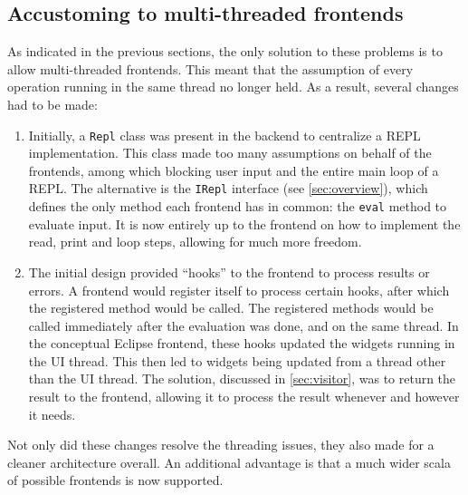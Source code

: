 \subsection{Accustoming to multi-threaded frontends}

As indicated in the previous sections, the only solution to these problems is to
allow multi-threaded frontends. This meant that the assumption of every
operation running in the same thread no longer held. As a result, several
changes had to be made:

\begin{enumerate}
  \item Initially, a \texttt{Repl} class was present in the backend to
  centralize a REPL implementation. This class made too many assumptions on
  behalf of the frontends, among which blocking user input and the entire main
  loop of a REPL. The alternative is the \texttt{IRepl} interface (see
  \cref{sec:overview}), which defines the only method each frontend has in
  common: the \texttt{eval} method to evaluate input. It is now entirely up to
  the frontend on how to implement the read, print and loop steps, allowing for
  much more freedom.
  \item	The initial design provided ``hooks'' to the frontend to process results or
  errors. A frontend would register itself to process certain hooks, after which
  the registered method would be called. The registered methods would be called
  immediately after the evaluation was done, and on the same thread. In the
  conceptual Eclipse frontend, these hooks updated the widgets running in the UI
  thread. This then led to widgets being updated from a thread other than the UI
  thread. The solution, discussed in \cref{sec:visitor}, was to return the
  result to the frontend, allowing it to process the result whenever and however
  it needs.
\end{enumerate}

Not only did these changes resolve the threading issues, they also made for a
cleaner architecture overall. An additional advantage is that a much wider scala
of possible frontends is now supported.

